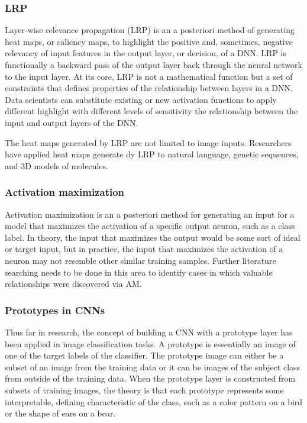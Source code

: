 \documentclass{IEEEtran}
\begin{document}
\subsubsection{LRP}

Layer-wise relevance propagation (LRP) is an a posteriori method of generating heat maps, or saliency maps, to highlight the positive and, sometimes, negative relevancy of input features in the output layer, or decision, of a DNN.  LRP is functionally a backward pass of the output layer back through the neural network to the input layer.  At its core, LRP is not a mathematical function but a set of constraints that defines properties of the relationship between layers in a DNN.  Data scientists can substitute existing or new activation functions to apply different highlight with different levels of sensitivity the relationship between the input and output layers of the DNN.

The heat maps generated by LRP are not limited to image inputs.  Researchers have applied heat maps generate dy LRP to natural language, genetic sequences, and 3D models of molecules.

\subsubsection{Activation maximization}

Activation maximization is an a posteriori method for generating an input for a model that maximizes the activation of a specific output neuron\cite{Nguyen2016}, such as a class label.  In theory, the input that maximizes the output would be some sort of ideal or target input, but in practice, the input that maximizes the activation of a neuron may not resemble other similar training samples.  Further literature searching needs to be done in this area to identify cases in which valuable relationships were discovered via AM.

\subsubsection{Prototypes in CNNs} Thus far in research, the concept of building a CNN with a prototype layer has been applied in image classification tasks.  A prototype is essentially an image of one of the target labels of the classifier.  The prototype image can either be a subset of an image from the training data or it can be images of the subject class from outside of the training data.  When the prototype layer is constructed from subsets of training images, the theory is that each prototype represents some interpretable, defining characteristic of the class, such as a color pattern on a bird or the shape of ears on a bear.
\end{document}
